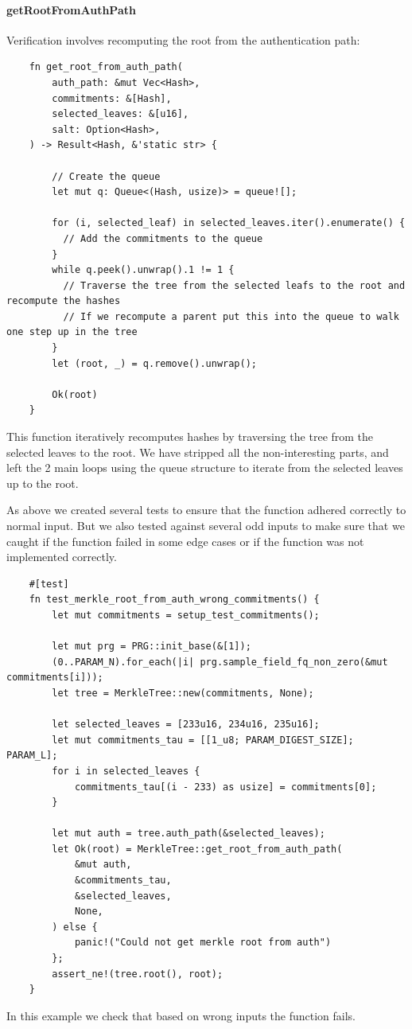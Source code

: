 \documentclass[11pt]{report}
\theoremstyle{definition}
\theoremstyle{plain}
\begin{document}
\paragraph{getRootFromAuthPath}\label{sec:get_root_from_auth_path}
Verification involves recomputing the root from the authentication path:
\begin{verbatim}
    fn get_root_from_auth_path(
        auth_path: &mut Vec<Hash>,
        commitments: &[Hash],
        selected_leaves: &[u16],
        salt: Option<Hash>,
    ) -> Result<Hash, &'static str> {

        // Create the queue
        let mut q: Queue<(Hash, usize)> = queue![];

        for (i, selected_leaf) in selected_leaves.iter().enumerate() {
          // Add the commitments to the queue
        }
        while q.peek().unwrap().1 != 1 {
          // Traverse the tree from the selected leafs to the root and recompute the hashes
          // If we recompute a parent put this into the queue to walk one step up in the tree
        }
        let (root, _) = q.remove().unwrap();

        Ok(root)
    }
\end{verbatim}
This function iteratively recomputes hashes by traversing the tree from the selected leaves to the root. We have stripped all the non-interesting parts, and left the 2 main loops using the queue structure to iterate from the selected leaves up to the root.

As above we created several tests to ensure that the function adhered correctly to normal input. But we also tested against several odd inputs to make sure that we caught if the function failed in some edge cases or if the function was not implemented correctly.
\begin{verbatim}
    #[test]
    fn test_merkle_root_from_auth_wrong_commitments() {
        let mut commitments = setup_test_commitments();

        let mut prg = PRG::init_base(&[1]);
        (0..PARAM_N).for_each(|i| prg.sample_field_fq_non_zero(&mut commitments[i]));
        let tree = MerkleTree::new(commitments, None);

        let selected_leaves = [233u16, 234u16, 235u16];
        let mut commitments_tau = [[1_u8; PARAM_DIGEST_SIZE]; PARAM_L];
        for i in selected_leaves {
            commitments_tau[(i - 233) as usize] = commitments[0];
        }

        let mut auth = tree.auth_path(&selected_leaves);
        let Ok(root) = MerkleTree::get_root_from_auth_path(
            &mut auth,
            &commitments_tau,
            &selected_leaves,
            None,
        ) else {
            panic!("Could not get merkle root from auth")
        };
        assert_ne!(tree.root(), root);
    }
\end{verbatim}
In this example we check that based on wrong inputs the function fails.
\end{document}
